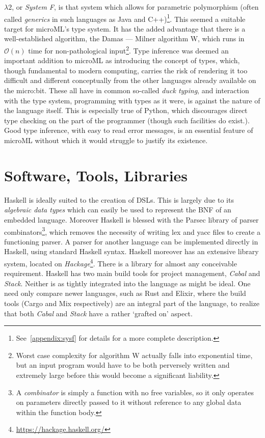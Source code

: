 \documentclass[12pt, a4paper]{report}
\begin{document}
$\lambda 2$, or \textit{System F}, is that system which allows for \gls{parametric polymorphism} (often
called \textit{generics} in such languages as Java and C++)\footnote{See~\ref{appendix:sysf} for
details for a more complete description.}. This seemed a suitable target for microML's type system.
It has the added advantage that there is a well-established algorithm, the Damas --- Milner algorithm
W, which runs in $\mathcal{O}(n)$ time for non-pathological input\footnote{Worst case complexity
for algorithm W actually falls into exponential time, but an input program would have to be both
perversely written and extremely large before this would become a significant liability.}. Type
inference was deemed an important addition to microML as introducing the concept of types, which,
though fundamental to modern computing, carries the risk of rendering it too difficult and different
conceptually from the other languages already available on the micro:bit. These all have in common
so-called \textit{\gls{duck typing}}, and interaction with the type system, programming with types as
it were, is against the nature of the language itself. This is especially true of Python, which
discourages direct type checking on the part of the programmer (though such facilities do exist.).
Good type inference, with easy to read error messages, is an essential feature of microML without
which it would struggle to justify its existence.

\section{Software, Tools, Libraries}
Haskell is ideally suited to the creation of \gls{DSL}s. This is largely due to its
\textit{algebraic data types} which can easily be used to represent the BNF of an embedded
language. Moreover Haskell is blessed with the Parsec library\cite{leijen2001} of parser combinators\footnote{A
\textit{combinator} is simply a function with no free variables, so it only operates on
parameters directly passed to it without reference to any global data within the function
body.}, which removes the necessity of writing lex and yacc files to create a functioning
parser. A parser for another language can be implemented directly in Haskell, using
standard Haskell syntax. Haskell moreover has an extensive library system, located on
\textit{Hackage}\footnote{\url{https://hackage.haskell.org/}}. There is a library for almost any
conceivable requirement. Haskell has two main build tools for project management, \textit{Cabal} and
\textit{Stack}. Neither is as tightly integrated into the language as might be ideal. One need only
compare newer languages, such as Rust and Elixir, where the build tools (Cargo and Mix respectively)
are an integral part of the language, to realize that both \textit{Cabal} and \textit{Stack} have a
rather `grafted on' aspect.
\end{document}
